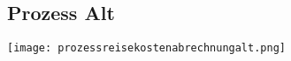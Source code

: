 \subsection{Prozess Alt}
\label{sec:Anhang:ProzessAlt}
\texttt{[image: prozessreisekostenabrechnungalt.png]}